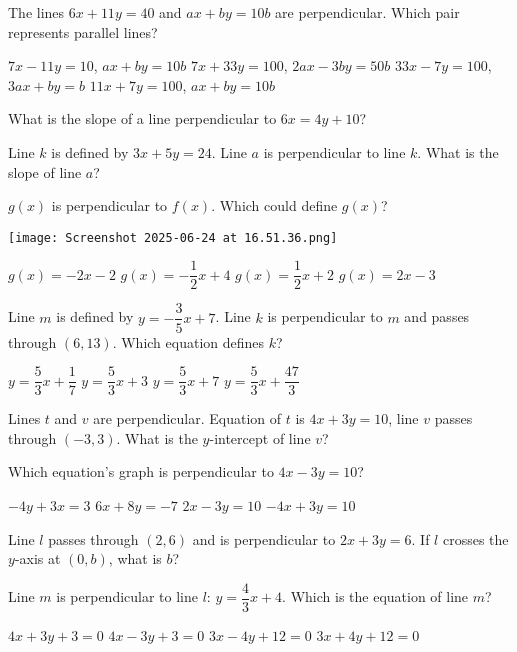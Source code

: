 \documentclass[12pt]{exam}
\begin{document}
\begin{questions}
\question The lines $6x + 11y = 40$ and $ax + by = 10b$ are perpendicular. Which pair represents parallel lines?
\begin{choices}
\choice $7x - 11y = 10$, $ax + by = 10b$
\choice $7x + 33y = 100$, $2ax - 3by = 50b$
\choice $33x - 7y = 100$, $3ax + by = b$
\choice $11x + 7y = 100$, $ax + by = 10b$
\end{choices}

\question What is the slope of a line perpendicular to $6x = 4y + 10$?

\question Line $k$ is defined by $3x + 5y = 24$. Line $a$ is perpendicular to line $k$. What is the slope of line $a$?

\question $g(x)$ is perpendicular to $f(x)$. Which could define $g(x)$?
\begin{center}
\texttt{[image: Screenshot 2025-06-24 at 16.51.36.png]}
\end{center}
\begin{choices}
\choice $g(x) = -2x - 2$
\choice $g(x) = -\dfrac{1}{2}x + 4$
\choice $g(x) = \dfrac{1}{2}x + 2$
\choice $g(x) = 2x - 3$
\end{choices}

\question Line $m$ is defined by $y = -\dfrac{3}{5}x + 7$. Line $k$ is perpendicular to $m$ and passes through $(6,13)$. Which equation defines $k$?
\begin{choices}
\choice $y = \dfrac{5}{3}x + \dfrac{1}{7}$
\choice $y = \dfrac{5}{3}x + 3$
\choice $y = \dfrac{5}{3}x + 7$
\choice $y = \dfrac{5}{3}x + \dfrac{47}{3}$
\end{choices}

\question Lines $t$ and $v$ are perpendicular. Equation of $t$ is $4x + 3y = 10$, line $v$ passes through $(-3,3)$. What is the $y$-intercept of line $v$?

\question Which equation's graph is perpendicular to $4x - 3y = 10$?
\begin{choices}
\choice $-4y + 3x = 3$
\choice $6x + 8y = -7$
\choice $2x - 3y = 10$
\choice $-4x + 3y = 10$
\end{choices}

\question Line $l$ passes through $(2,6)$ and is perpendicular to $2x + 3y = 6$. If $l$ crosses the $y$-axis at $(0,b)$, what is $b$?

\question Line $m$ is perpendicular to line $l$: $y = \dfrac{4}{3}x + 4$. Which is the equation of line $m$?
\begin{choices}
\choice $4x + 3y + 3 = 0$
\choice $4x - 3y + 3 = 0$
\choice $3x - 4y + 12 = 0$
\choice $3x + 4y + 12 = 0$
\end{choices}


\end{questions}
\end{document}
